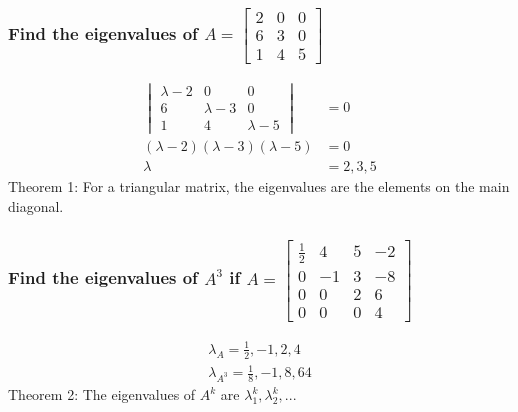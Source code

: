 \documentclass[
  letterpaper,
  DIV=11,
  numbers=noendperiod]{scrartcl}
\begin{document}
\newpage{}

\subsubsection{\texorpdfstring{Find the eigenvalues of
\(A = \begin{bmatrix}2 & 0 & 0 \\ 6 & 3 & 0 \\ 1 & 4 & 5 \end{bmatrix}\)}{Find the eigenvalues of A = \textbackslash begin\{bmatrix\}2 \& 0 \& 0 \textbackslash\textbackslash{} 6 \& 3 \& 0 \textbackslash\textbackslash{} 1 \& 4 \& 5 \textbackslash end\{bmatrix\}}}\label{find-the-eigenvalues-of-a-beginbmatrix2-0-0-6-3-0-1-4-5-endbmatrix}

\begin{align*}
\begin{vmatrix}\lambda-2 & 0 & 0 \\ 6 & \lambda-3 & 0 \\ 1 & 4 & \lambda-5\end{vmatrix} &= 0 \\
(\lambda-2)(\lambda-3)(\lambda-5) &= 0 \\
\lambda &= 2, 3, 5
\end{align*} Theorem 1: For a triangular matrix, the eigenvalues are the
elements on the main diagonal.

\subsubsection{\texorpdfstring{Find the eigenvalues of \(A^3\) if
\(A=\begin{bmatrix}\frac{1}{2} & 4 & 5 & -2 \\ 0 & -1 & 3 & -8 \\ 0 & 0 & 2 & 6 \\ 0 & 0 & 0 & 4\end{bmatrix}\)}{Find the eigenvalues of A\^{}3 if A=\textbackslash begin\{bmatrix\}\textbackslash frac\{1\}\{2\} \& 4 \& 5 \& -2 \textbackslash\textbackslash{} 0 \& -1 \& 3 \& -8 \textbackslash\textbackslash{} 0 \& 0 \& 2 \& 6 \textbackslash\textbackslash{} 0 \& 0 \& 0 \& 4\textbackslash end\{bmatrix\}}}\label{find-the-eigenvalues-of-a3-if-abeginbmatrixfrac12-4-5--2-0--1-3--8-0-0-2-6-0-0-0-4endbmatrix}

\begin{align*}
\lambda_A = \frac{1}{2}, -1, 2, 4 \\
\lambda_{A^3} = \frac{1}{8}, -1, 8, 64
\end{align*} Theorem 2: The eigenvalues of \(A^k\) are
\(\lambda_1^k, \lambda_2^k, ...\)
\end{document}
